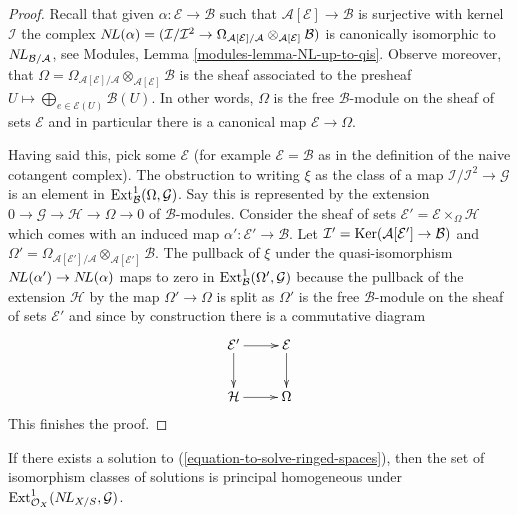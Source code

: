 \begin{proof}
Recall that given $\alpha : \mathcal{E} \to \mathcal{B}$
such that $\mathcal{A}[\mathcal{E}] \to \mathcal{B}$ is surjective
with kernel $\mathcal{I}$ the complex
$\mathop{N\!L}\nolimits(\alpha) = (\mathcal{I}/\mathcal{I}^2 \to 
\Omega_{\mathcal{A}[\mathcal{E}]/\mathcal{A}}
\otimes_{\mathcal{A}[\mathcal{E}]} \mathcal{B})$ is canonically
isomorphic to $\mathop{N\!L}\nolimits_{\mathcal{B}/\mathcal{A}}$, see
Modules, Lemma \ref{modules-lemma-NL-up-to-qis}.
Observe moreover, that
$\Omega = \Omega_{\mathcal{A}[\mathcal{E}]/\mathcal{A}}
\otimes_{\mathcal{A}[\mathcal{E}]} \mathcal{B}$ is the sheaf
associated to the presheaf
$U \mapsto \bigoplus_{e \in \mathcal{E}(U)} \mathcal{B}(U)$.
In other words, $\Omega$ is the free $\mathcal{B}$-module on the
sheaf of sets $\mathcal{E}$ and in particular there is a canonical
map $\mathcal{E} \to \Omega$.

\medskip\noindent
Having said this, pick some $\mathcal{E}$ (for example
$\mathcal{E} = \mathcal{B}$ as in the definition of the naive cotangent
complex). The obstruction to writing $\xi$ as the class of a map
$\mathcal{I}/\mathcal{I}^2 \to \mathcal{G}$ is an element in
$\mathop{\mathrm{Ext}}\nolimits^1_\mathcal{B}(\Omega, \mathcal{G})$. Say this is represented
by the extension $0 \to \mathcal{G} \to \mathcal{H} \to \Omega \to 0$
of $\mathcal{B}$-modules. Consider the sheaf of sets
$\mathcal{E}' = \mathcal{E} \times_\Omega \mathcal{H}$
which comes with an induced map $\alpha' : \mathcal{E}' \to \mathcal{B}$.
Let $\mathcal{I}' = \mathop{\mathrm{Ker}}(\mathcal{A}[\mathcal{E}'] \to \mathcal{B})$
and $\Omega' = \Omega_{\mathcal{A}[\mathcal{E}']/\mathcal{A}}
\otimes_{\mathcal{A}[\mathcal{E}']} \mathcal{B}$.
The pullback of $\xi$ under the quasi-isomorphism
$\mathop{N\!L}\nolimits(\alpha') \to \mathop{N\!L}\nolimits(\alpha)$ maps to zero in
$\mathop{\mathrm{Ext}}\nolimits^1_\mathcal{B}(\Omega', \mathcal{G})$
because the pullback of the extension $\mathcal{H}$
by the map $\Omega' \to \Omega$ is split as $\Omega'$ is the free
$\mathcal{B}$-module on the sheaf of sets $\mathcal{E}'$ and since
by construction there is a commutative diagram
$$
\xymatrix{
\mathcal{E}' \ar[r] \ar[d] & \mathcal{E} \ar[d] \\
\mathcal{H} \ar[r] & \Omega
}
$$
This finishes the proof.
\end{proof}

\begin{lemma}
\label{lemma-choices-ringed-spaces}
If there exists a solution to (\ref{equation-to-solve-ringed-spaces}),
then the set of isomorphism classes of solutions is principal homogeneous
under $\mathop{\mathrm{Ext}}\nolimits^1_{\mathcal{O}_X}(\mathop{N\!L}\nolimits_{X/S}, \mathcal{G})$.
\end{lemma}

